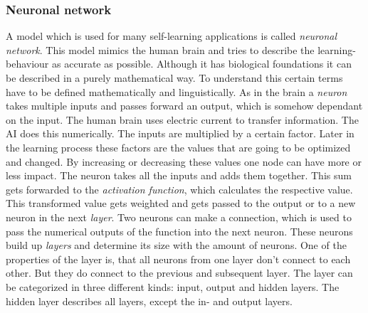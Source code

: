 \documentclass[12pt]{article}
\begin{document}
\subsubsection{Neuronal network}
A model which is used for many self-learning applications is called \textit{neuronal network}. 
This model mimics the human brain and tries to describe the learning-behaviour as accurate as possible. Although it has biological foundations it can be described in a purely mathematical way. To understand this certain terms have to be defined mathematically and linguistically.
As in the brain a \textit{neuron} takes multiple inputs and passes forward an output, which is somehow dependant on the input. The human brain uses electric current to transfer information. The AI does this numerically. The inputs are multiplied by a certain factor. Later in the learning process these factors are the values that are going to be optimized and changed. By increasing or decreasing these values one node can have more or less impact. The neuron takes all the inputs and adds them together. This sum gets forwarded to the \textit{activation function}, which calculates the respective value. This transformed value gets weighted and gets passed to the output or to a new neuron in the next \textit{layer}. Two neurons can make a connection, which is used to pass the numerical outputs of the function into the next neuron. These neurons build up \textit{layers} and determine its size with the amount of neurons. One of the properties of the layer is, that all neurons from one layer don't connect to each other. But they do connect to the previous and subsequent layer. The layer can be categorized in three different kinds: input, output and hidden layers. The hidden layer describes all layers, except the in- and output layers. \cite{neuronal_network}\\
\end{document}
